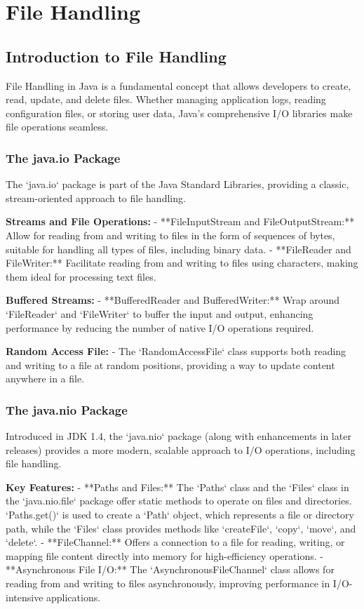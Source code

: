 \documentclass{article}
\begin{document}
\newpage
\section{File Handling}
\subsection{Introduction to File Handling}
File Handling in Java is a fundamental concept that allows developers to create, read, update, and delete files. Whether managing application logs, reading configuration files, or storing user data, Java's comprehensive I/O libraries make file operations seamless.

\subsubsection{The java.io Package}
The `java.io` package is part of the Java Standard Libraries, providing a classic, stream-oriented approach to file handling.

\textbf{Streams and File Operations:}
- **FileInputStream and FileOutputStream:** Allow for reading from and writing to files in the form of sequences of bytes, suitable for handling all types of files, including binary data.
- **FileReader and FileWriter:** Facilitate reading from and writing to files using characters, making them ideal for processing text files.

\textbf{Buffered Streams:}
- **BufferedReader and BufferedWriter:** Wrap around `FileReader` and `FileWriter` to buffer the input and output, enhancing performance by reducing the number of native I/O operations required.

\textbf{Random Access File:}
- The `RandomAccessFile` class supports both reading and writing to a file at random positions, providing a way to update content anywhere in a file.

\subsubsection{The java.nio Package}
Introduced in JDK 1.4, the `java.nio` package (along with enhancements in later releases) provides a more modern, scalable approach to I/O operations, including file handling.

\textbf{Key Features:}
- **Paths and Files:** The `Paths` class and the `Files` class in the `java.nio.file` package offer static methods to operate on files and directories. `Paths.get()` is used to create a `Path` object, which represents a file or directory path, while the `Files` class provides methods like `createFile`, `copy`, `move`, and `delete`.
- **FileChannel:** Offers a connection to a file for reading, writing, or mapping file content directly into memory for high-efficiency operations.
- **Asynchronous File I/O:** The `AsynchronousFileChannel` class allows for reading from and writing to files asynchronously, improving performance in I/O-intensive applications.
\end{document}
